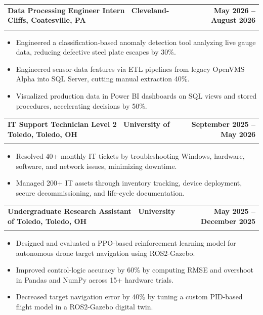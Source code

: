 \documentclass[letterpaper,11pt]{article}
\makeatletter
\newcommand{\resumeItem}[1]{\item\small{#1 \vspace{-4pt}}}
\newcommand{\resumeSubheading}[4]{
    \vspace{-2pt}\item
    \begin{tabular*}{1.0\textwidth}[t]{l@{\extracolsep{\fill}}r}
        \textbf{#1} & \textbf{\small #2} \\
        \textit{\small#3} & \textit{\small #4}
    \end{tabular*}\vspace{-7pt}
}
\newcommand{\resumeItemListStart}{\begin{itemize}}
\newcommand{\resumeItemListEnd}{\end{itemize}\vspace{-7pt}}
\makeatother
\begin{document}
\resumeSubheading
{\textbf{Data Processing Engineer Intern} \textnormal{\textbar\ Cleveland-Cliffs, Coatesville, PA}}{May 2026 -- August 2026}
{}{}
\vspace{-0.6cm}
\resumeItemListStart

\resumeItem{Engineered a classification-based anomaly detection tool analyzing live gauge data, reducing defective steel plate escapes by 30\%.}

\vspace{0.15cm}

\resumeItem{Engineered sensor-data features via ETL pipelines from legacy OpenVMS Alpha into SQL Server, cutting manual extraction 40\%.}
\vspace{0.15cm}


\resumeItem{Visualized production data in Power BI dashboards on SQL views and stored procedures, accelerating decisions by 50\%.}

\vspace{0.15cm}
\resumeItemListEnd
\resumeSubheading
{\textbf{IT Support Technician Level 2} \textnormal{\textbar\ University of Toledo, Toledo, OH}}{September 2025 -- May 2026}
{}{}
\vspace{-0.6cm}
\resumeItemListStart

\resumeItem{Resolved 40+ monthly IT tickets by troubleshooting Windows, hardware, software, and network issues, minimizing downtime.}

\vspace{0.15cm}
\resumeItem{Managed 200+ IT assets through inventory tracking, device deployment, secure decommissioning, and life-cycle documentation.}

\vspace{0.15cm}

\resumeItemListEnd

\resumeSubheading
{\textbf{Undergraduate Research Assistant} \textnormal{\textbar\ University of Toledo, Toledo, OH}}{May 2025 -- December 2025}
{}{}
\vspace{-0.6cm}
\resumeItemListStart
\resumeItem{Designed and evaluated a PPO-based reinforcement learning model for autonomous drone target navigation using ROS2-Gazebo.}
\vspace{0.15cm}
\resumeItem{Improved control-logic accuracy by 60\% by computing RMSE and overshoot in Pandas and NumPy across 15+ hardware trials.}
\vspace{0.15cm}
\resumeItem{Decreased target navigation error by 40\% by tuning a custom PID-based flight model in a ROS2-Gazebo digital twin.}
\resumeItemListEnd
\end{document}
